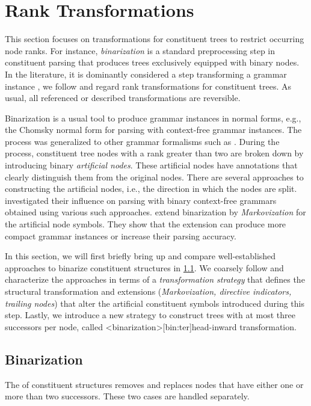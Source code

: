 \documentclass[../../document.tex]{subfiles}
\begin{document}
    \section{Rank Transformations}\label{sec:ranktransformations}
    This section focuses on transformations for constituent trees to restrict occurring node ranks.
    For instance, \emph{binarization} is a standard preprocessing step in constituent parsing that produces trees exclusively equipped with binary nodes.
    In the literature, it is dominantly considered a step transforming a grammar instance \citep[e.g.\@]{KleMan03,Son08,Kal10}, we follow \citet{CraSchBod16} and regard rank transformations for constituent trees.
    As usual, all referenced or described transformations are reversible.

    Binarization is a usual tool to produce grammar instances in normal forms, e.g., the Chomsky normal form for parsing with context-free grammar instances.
    The process was generalized to other grammar formalisms such as . \citep{Kal10, Cra12}
    During the process, constituent tree nodes with a rank greater than two are broken down by introducing binary \emph{artificial nodes}.
    These artificial nodes have annotations that clearly distinguish them from the original nodes.
    There are several approaches to constructing the artificial nodes, i.e., the direction in which the nodes are split.
    \citet{Son08} investigated their influence on parsing with binary context-free grammars obtained using various such approaches.
    \citet{KleMan03} extend binarization by \emph{Markovization} for the artificial node symbols.
    They show that the extension can produce more compact grammar instances or increase their parsing accuracy.

    In this section, we will first briefly bring up and compare well-established approaches to binarize constituent structures in \cref{sec:binarization}.
    We coarsely follow \citet{Cra12} and characterize the approaches in terms of a \emph{transformation strategy} that defines the structural transformation and extensions (\emph{Markovization, directive indicators, trailing nodes}) that alter the artificial constituent symbols introduced during this step.
    Lastly, we introduce a new strategy to construct trees with at most three successors per node, called <binarization>[bin:ter]{head-inward transformation}.

    \subsection{Binarization}\label{sec:binarization}
    The  of constituent structures removes and replaces nodes that have either one or more than two successors.
    These two cases are handled separately.
\end{document}

